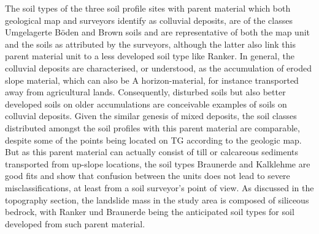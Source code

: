 \documentclass[preprint,12pt,authoryear]{elsarticle}
\begin{document}
The soil types of the three soil profile sites with parent material which both geological map and surveyors identify as colluvial deposits, are of the classes Umgelagerte B\"oden and Brown soils and are representative of both the map unit and the soils as attributed by the surveyors, although the latter also link this parent material unit to a less developed soil type like Ranker. In general, the colluvial deposits are characterised, or understood, as the accumulation of eroded slope material, which can also be A horizon-material,  for instance transported away from agricultural lands. Consequently, disturbed soils but also better developed soils on older accumulations are  conceivable examples of soils on colluvial deposits.  
Given the similar genesis of mixed deposits, the soil classes distributed amongst the soil profiles with this parent material are comparable, despite some of the points being located on TG according to the geologic map. But as this parent material can actually consist of till or calcareous sediments transported from up-slope locations, the soil types Braunerde and Kalklehme are good fits and show that confusion between the units does not lead to severe misclassifications, at least from a soil surveyor's point of view.    
As discussed in the topography section, the landslide mass in the study area is composed of siliceous bedrock, with Ranker und Braunerde being the anticipated soil types for soil developed from such parent material. 
\end{document}
